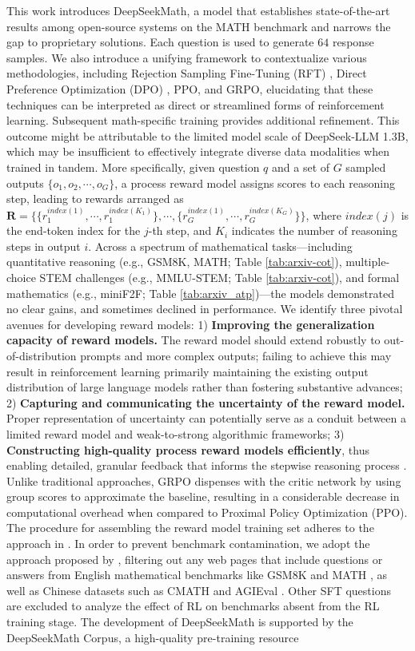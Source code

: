 This work introduces DeepSeekMath, a model that establishes state-of-the-art results among open-source systems on the MATH benchmark and narrows the gap to proprietary solutions. Each question is used to generate $64$ response samples. We also introduce a unifying framework to contextualize various methodologies, including Rejection Sampling Fine-Tuning (RFT) \citep{yuan2023scaling}, Direct Preference Optimization (DPO) \citep{dpo}, PPO, and GRPO, elucidating that these techniques can be interpreted as direct or streamlined forms of reinforcement learning. Subsequent math-specific training provides additional refinement. This outcome might be attributable to the limited model scale of DeepSeek-LLM 1.3B, which may be insufficient to effectively integrate diverse data modalities when trained in tandem. More specifically, given question $q$ and a set of $G$ sampled outputs $\{o_1, o_2, \cdots, o_G\}$, a process reward model assigns scores to each reasoning step, leading to rewards arranged as $\mathbf{R} = \{ \{r_1^{index(1)},\cdots,r_1^{index(K_1)}\}, \cdots,  \{r_G^{index(1)},\cdots,r_G^{index(K_G)}\} \}$, where $index(j)$ is the end-token index for the $j$-th step, and $K_i$ indicates the number of reasoning steps in output $i$. Across a spectrum of mathematical tasks—including quantitative reasoning (e.g., GSM8K, MATH; Table \ref{tab:arxiv-cot}), multiple-choice STEM challenges (e.g., MMLU-STEM; Table \ref{tab:arxiv-cot}), and formal mathematics (e.g., miniF2F; Table \ref{tab:arxiv_atp})—the models demonstrated no clear gains, and sometimes declined in performance. We identify three pivotal avenues for developing reward models: 1) \textbf{Improving the generalization capacity of reward models.} The reward model should extend robustly to out-of-distribution prompts and more complex outputs; failing to achieve this may result in reinforcement learning primarily maintaining the existing output distribution of large language models rather than fostering substantive advances; 2) \textbf{Capturing and communicating the uncertainty of the reward model.} Proper representation of uncertainty can potentially serve as a conduit between a limited reward model and weak-to-strong algorithmic frameworks; 3) \textbf{Constructing high-quality process reward models efficiently}, thus enabling detailed, granular feedback that informs the stepwise reasoning process \citep{lightman2023let,wang2023math}. Unlike traditional approaches, GRPO dispenses with the critic network by using group scores to approximate the baseline, resulting in a considerable decrease in computational overhead when compared to Proximal Policy Optimization (PPO). The procedure for assembling the reward model training set adheres to the approach in \citep{wang2023math}. In order to prevent benchmark contamination, we adopt the approach proposed by \cite{deepseek-coder}, filtering out any web pages that include questions or answers from English mathematical benchmarks like GSM8K \citep{gsm8k} and MATH \citep{MATH}, as well as Chinese datasets such as CMATH \citep{wei2023cmath} and AGIEval \citep{agieval}. Other SFT questions are excluded to analyze the effect of RL on benchmarks absent from the RL training stage. The development of DeepSeekMath is supported by the DeepSeekMath Corpus, a high-quality pre-training resource 